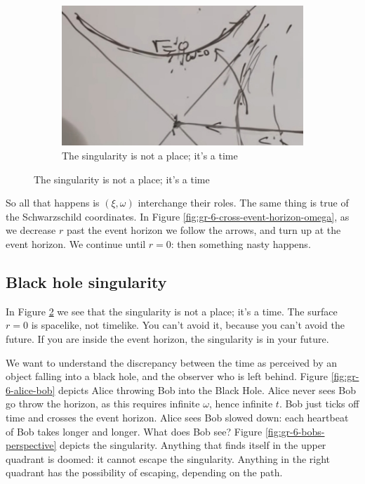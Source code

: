 \documentclass[]{article}
\begin{document}
{\begin{figure}[H]
\begin{subfigure}[t]{0.3\textwidth}
	\end{subfigure}
	\begin{subfigure}[t]{0.3\textwidth}
		\caption{The singularity is not a place; it's a time} \label{fig:gr-6-singularity}
		\includegraphics[width=\textwidth]{gr-6-singularity}
	\end{subfigure}
\end{figure}

So all that happens is $(\xi,\omega)$ interchange their roles. The same thing is true of the Schwarzschild coordinates. In Figure \ref{fig:gr-6-cross-event-horizon-omega}, as we decrease $r$ past the event horizon we follow the arrows, and turn up at the event horizon. We continue until $r=0$: then something nasty happens.

\subsection{Black hole singularity}

In Figure \ref{fig:gr-6-singularity} we see that the singularity is not a place; it's a time. The surface $r=0$ is spacelike, not timelike. You can't avoid it, because you can't avoid the future. If you are inside the event horizon, the singularity is in your future.

We want to understand the discrepancy between the  time as perceived by an object falling  into a black hole, and the observer who is left behind. Figure \ref{fig:gr-6-alice-bob} depicts Alice throwing Bob into the Black Hole. Alice never sees Bob go throw the horizon, as this requires infinite $\omega$, hence infinite $t$. Bob just ticks off time and crosses the event horizon. Alice sees Bob slowed down: each heartbeat of Bob takes longer and longer. What does Bob see? Figure \ref{fig:gr-6-bobs-perspective} depicts the singularity. Anything that finds itself in the upper quadrant is doomed: it cannot escape the singularity. Anything in the right quadrant has the possibility of escaping, depending on the path.

}
\end{document}
